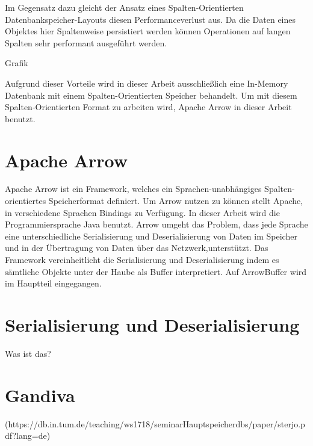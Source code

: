 Im Gegensatz dazu gleicht der Ansatz eines Spalten-Orientierten Datenbankspeicher-Layouts diesen Performanceverlust aus. 
Da die Daten eines Objektes hier Spaltenweise persistiert werden können Operationen auf langen Spalten sehr performant ausgeführt werden.

Grafik

Aufgrund dieser Vorteile wird in dieser Arbeit ausschließlich eine In-Memory Datenbank mit einem Spalten-Orientierten Speicher behandelt.
Um mit diesem Spalten-Orientierten Format zu arbeiten wird, Apache Arrow in dieser Arbeit benutzt.

\section{Apache Arrow}

Apache Arrow ist ein Framework, welches ein Sprachen-unabhängiges Spalten-orientiertes Speicherformat definiert. 
Um Arrow nutzen zu können stellt Apache, in verschiedene Sprachen Bindings zu Verfügung. In dieser Arbeit wird die Programmiersprache Java benutzt.
Arrow umgeht das Problem, dass jede Sprache eine unterschiedliche Serialisierung und Deserialisierung von Daten im Speicher und in der Übertragung von Daten über das Netzwerk,unterstützt.
Das Framework vereinheitlicht die Serialisierung und Deserialisierung indem es sämtliche Objekte unter der Haube als Buffer interpretiert.
Auf ArrowBuffer wird im Hauptteil eingegangen.


\section{Serialisierung und Deserialisierung}

Was ist das?

\section{Gandiva}


 



(https://db.in.tum.de/teaching/ws1718/seminarHauptspeicherdbs/paper/sterjo.pdf?lang=de)